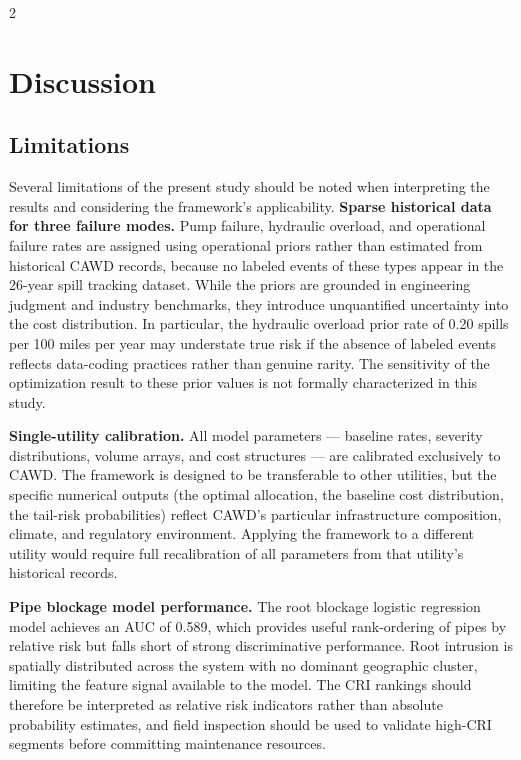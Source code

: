 \documentclass[10pt]{article}
\begin{document}
\begin{multicols}{2}
\section{Discussion}
\subsection{Limitations}
 
Several limitations of the present study should be noted when
interpreting the results and considering the framework's
applicability.
\textbf{Sparse historical data for three failure modes.} Pump
failure, hydraulic overload, and operational failure rates are
assigned using operational priors rather than estimated from
historical CAWD records, because no labeled events of these types
appear in the 26-year spill tracking dataset. While the priors
are grounded in engineering judgment and industry benchmarks,
they introduce unquantified uncertainty into the cost distribution.
In particular, the hydraulic overload prior rate of 0.20 spills
per 100 miles per year may understate true risk if the absence
of labeled events reflects data-coding practices rather than
genuine rarity. The sensitivity of the optimization result to
these prior values is not formally characterized in this study.

\textbf{Single-utility calibration.} All model parameters ---
baseline rates, severity distributions, volume arrays, and cost
structures --- are calibrated exclusively to CAWD. The framework
is designed to be transferable to other utilities, but the
specific numerical outputs (the optimal allocation, the baseline
cost distribution, the tail-risk probabilities) reflect CAWD's
particular infrastructure composition, climate, and regulatory
environment. Applying the framework to a different utility would
require full recalibration of all parameters from that utility's
historical records.

\textbf{Pipe blockage model performance.} The root blockage
logistic regression model achieves an AUC of 0.589, which
provides useful rank-ordering of pipes by relative risk but
falls short of strong discriminative performance. Root intrusion
is spatially distributed across the system with no dominant
geographic cluster, limiting the feature signal available to
the model. The CRI rankings should therefore be interpreted as
relative risk indicators rather than absolute probability
estimates, and field inspection should be used to validate
high-CRI segments before committing maintenance resources.


\end{multicols}
\end{document}
